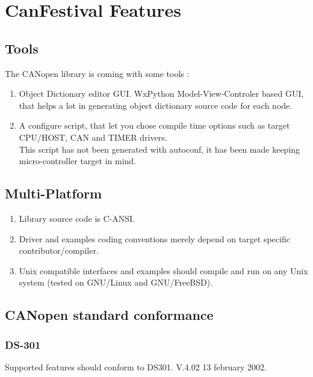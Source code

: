 \documentclass[12pt,english,a4paper]{book}
\newcommand{\canopen}{CANopen }
\begin{document}
\section{CanFestival Features}


\subsection{Tools }

The \canopen library is coming with some tools :

\begin{enumerate}
\item Object Dictionary editor GUI. WxPython Model-View-Controler based
GUI, that helps a lot in generating object dictionary source code for
each node. 
\item A configure script, that let you chose compile time options such as
target CPU/HOST, CAN and TIMER drivers.\\
 This script has not been generated with autoconf, it has been made
keeping micro-controller target in mind. 
\end{enumerate}

\subsection{Multi-Platform}

\begin{enumerate}
\item Library source code is C-ANSI. 
\item Driver and examples coding conventions merely depend on target specific
contributor/compiler. 
\item Unix compatible interfaces and examples should compile and run on
any Unix system (tested on GNU/Linux and GNU/FreeBSD). 
\end{enumerate}

\subsection{\canopen standard conformance}

\subsubsection{DS-301}

Supported features should conform to DS301. V.4.02 13 february 2002. 
\end{document}
